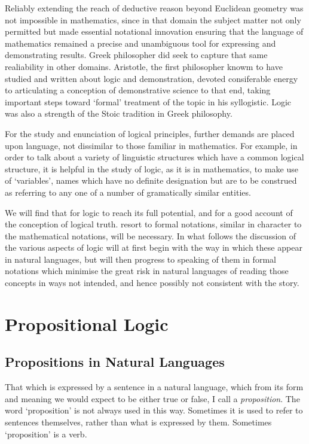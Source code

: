 \documentclass[10pt,titlepage]{article}
\begin{document}
Reliably extending the reach of deductive reason beyond Euclidean geometry was not impossible in mathematics, since in that domain the subject matter not only permitted but made essential notational innovation ensuring that the language of mathematics remained a precise and unambiguous tool for expressing and demonstrating results.
Greek philosopher did seek to capture that same realiability in other domains.
Aristotle, the first philosopher knowm to have studied and written about logic and demonstration, devoted consiferable energy to articulating a conception of demonstrative science to that end, taking important steps toward `formal' treatment of the topic in his syllogistic.
Logic was also a strength of the Stoic tradition in Greek philosophy.

For the study and enunciation of logical principles, further demands are placed upon language, not dissimilar to those familiar in mathematics.
For example, in order to talk about a variety of linguistic structures which have a common logical structure, it is helpful in the study of logic, as it is in mathematics, to make use of `variables', names which have no definite designation but are to be construed as referring to any one of a number of gramatically similar entities.

We will find that for logic to reach its full potential, and for a good account of the conception of logical truth. resort to formal notations, similar in character to the mathematical notations, will be necessary.
In what follows the discussion of the various aspects of logic will at first begin with the way in which these appear in natural languages, but will then progress to speaking of them in formal notations which minimise the great risk in natural languages of reading those concepts in ways not intended, and hence possibly not consistent with the story.

\section{Propositional Logic}

\subsection{Propositions in Natural Languages}

That which is expressed by a sentence in a natural language, which from its form and meaning we would expect to be either true or false, I call a {\it proposition}.
The word `proposition' is not always used in this way.
Sometimes it is used to refer to sentences themselves, rather than what is expressed by them.
Sometimes `proposition' is a verb.
\end{document}
